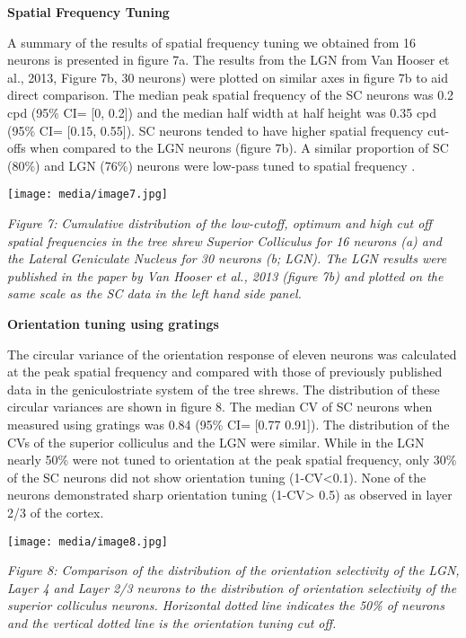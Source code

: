 \textbf{Spatial Frequency Tuning}

A summary of the results of spatial frequency tuning we obtained from 16
neurons is presented in figure 7a. The results from the LGN from Van
Hooser et al., 2013, Figure 7b, 30 neurons) were plotted on similar axes
in figure 7b to aid direct comparison. The median peak spatial frequency
of the SC neurons was 0.2 cpd (95\% CI= {[}0, 0.2{]}) and the median
half width at half height was 0.35 cpd (95\% CI= {[}0.15, 0.55{]}). SC
neurons tended to have higher spatial frequency cut-offs when compared
to the LGN neurons (figure 7b). A similar proportion of SC (80\%) and
LGN (76\%) neurons were low-pass tuned to spatial frequency .

\texttt{[image: media/image7.jpg]}

\emph{Figure 7:} \emph{Cumulative distribution of the low-cutoff,
optimum and high cut off spatial frequencies in the tree shrew Superior
Colliculus for 16 neurons (a) and the Lateral Geniculate Nucleus for 30
neurons (b; LGN). The LGN results were published in the paper by Van
Hooser et al., 2013 (figure 7b) and plotted on the same scale as the SC
data in the left hand side panel.}

\textbf{Orientation tuning using gratings}

The circular variance of the orientation response of eleven neurons was
calculated at the peak spatial frequency and compared with those of
previously published data in the geniculostriate system of the tree
shrews. The distribution of these circular variances are shown in figure
8. The median CV of SC neurons when measured using gratings was 0.84
(95\% CI= {[}0.77 0.91{]}). The distribution of the CVs of the superior
colliculus and the LGN were similar. While in the LGN nearly 50\% were
not tuned to orientation at the peak spatial frequency, only 30\% of the
SC neurons did not show orientation tuning (1-CV\textless{}0.1). None of
the neurons demonstrated sharp orientation tuning (1-CV\textgreater{}
0.5) as observed in layer 2/3 of the cortex.

\texttt{[image: media/image8.jpg]}

\emph{Figure 8: Comparison of the distribution of the orientation
selectivity of the LGN, Layer 4 and Layer 2/3 neurons to the
distribution of orientation selectivity of the superior colliculus
neurons. Horizontal dotted line indicates the 50\% of neurons and the
vertical dotted line is the orientation tuning cut off.}

